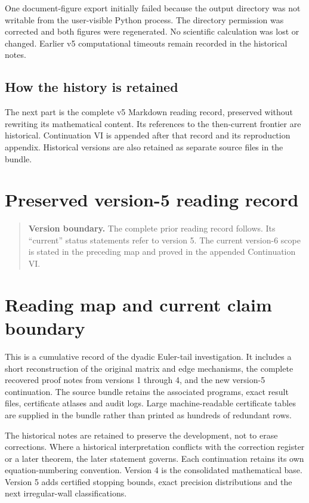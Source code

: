 \documentclass[11pt,letterpaper]{article}
\begin{document}
One document-figure export initially failed because the output directory was not writable from the user-visible Python process. The directory permission was corrected and both figures were regenerated. No scientific calculation was lost or changed. Earlier v5 computational timeouts remain recorded in the historical notes.

\subsection{How the history is retained}\label{how-the-history-is-retained}

The next part is the complete v5 Markdown reading record, preserved without rewriting its mathematical content. Its references to the then-current frontier are historical. Continuation VI is appended after that record and its reproduction appendix. Historical versions are also retained as separate source files in the bundle.

\clearpage

\section{Preserved version-5 reading record}\label{preserved-version-5-reading-record}

\begin{quote}
\textbf{Version boundary.} The complete prior reading record follows. Its ``current'' status statements refer to version 5. The current version-6 scope is stated in the preceding map and proved in the appended Continuation VI.
\end{quote}

\section{Reading map and current claim boundary}\label{reading-map-and-current-claim-boundary}

This is a cumulative record of the dyadic Euler-tail investigation. It includes a short reconstruction of the original matrix and edge mechanisms, the complete recovered proof notes from versions 1 through 4, and the new version-5 continuation. The source bundle retains the associated programs, exact result files, certificate atlases and audit logs. Large machine-readable certificate tables are supplied in the bundle rather than printed as hundreds of redundant rows.

The historical notes are retained to preserve the development, not to erase corrections. Where a historical interpretation conflicts with the correction register or a later theorem, the later statement governs. Each continuation retains its own equation-numbering convention. Version 4 is the consolidated mathematical base. Version 5 adds certified stopping bounds, exact precision distributions and the next irregular-wall classifications.
\end{document}
